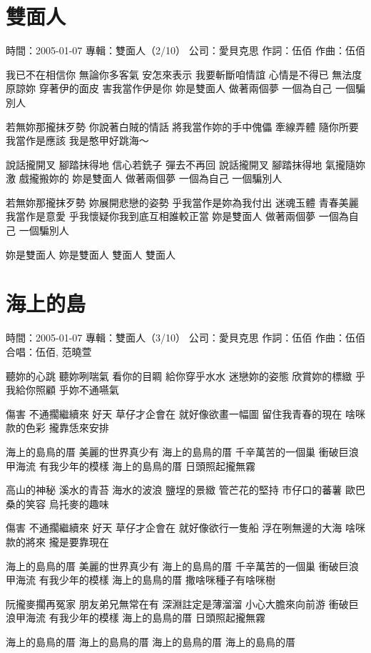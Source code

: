 \documentclass[UTF8,a4paper,oneside,twocolumn,12pt]{ctexbook}
\newcommand{\infopair}[2]{\textbullet #1：#2}
\newcommand{\zc}[1][伍佰]{\infopair{作詞}{#1}}
\newcommand{\zq}[1][伍佰]{\infopair{作曲}{#1}}
\newcommand{\zj}[1]{\infopair{專輯}{#1}}
\newcommand{\sj}[1]{\infopair{時間}{#1}}
\newcommand{\gs}[1]{\infopair{公司}{#1}}
\newenvironment{info}{\begin{flushleft}\kaishu
	}
	{\end{flushleft}\normalsize\yahei\par}
\newenvironment{lyric}{
	}
{}
\begin{document}
\section{雙面人}
\begin{info}
	\sj{2005-01-07}
	\zj{雙面人（2/10）}
	\gs{愛貝克思}
	\zc
	\zq
\end{info}
\begin{lyric}
	我已不在相信你 無論你多客氣
	安怎來表示 我要斬斷咱情誼
	心情是不得已 無法度原諒妳
	穿著伊的面皮 害我當作伊是你
	妳是雙面人 做著兩個夢
	一個為自己 一個騙別人

	若無妳那攏抹歹勢 你說著白賊的情話
	將我當作妳的手中傀儡
	牽線弄體 隨你所要 我當作是應該
	我是憨甲好跳海～

	說話攏開叉 腳踏抹得地
	信心若銑子 彈去不再回
	說話攏開叉 腳踏抹得地
	氣攏隨妳激 戲攏搬妳的
	妳是雙面人 做著兩個夢
	一個為自己 一個騙別人

	若無妳那攏抹歹勢 妳展開悲戀的姿勢
	乎我當作是妳為我付出
	迷魂玉體 青春美麗 我當作是意愛
	乎我懷疑你我到底互相誰較正當
	妳是雙面人 做著兩個夢
	一個為自己 一個騙別人

	妳是雙面人 妳是雙面人 雙面人 雙面人
\end{lyric}

\section{海上的島}
\begin{info}
	\sj{2005-01-07}
	\zj{雙面人（3/10）}
	\gs{愛貝克思}
	\zc
	\zq
	\infopair{合唱}{伍佰, 范曉萱}
\end{info}
\begin{lyric}
	聽妳的心跳 聽妳咧喘氣
	看你的目睭 給你穿乎水水
	迷戀妳的姿態 欣賞妳的標緻
	乎我給你照顧 乎妳不通嚥氣

	傷害 不通擱繼續來
	好天 草仔才企會在
	就好像欲畫一幅圖 留住我青春的現在
	啥咪款的色彩 攏靠恁來安排

	海上的島鳥的厝 美麗的世界真少有
	海上的島鳥的厝 千辛萬苦的一個巢
	衝破巨浪甲海流 有我少年的模樣
	海上的島鳥的厝 日頭照起攏無霧

	高山的神秘 溪水的青苔
	海水的波浪 鹽埕的景緻
	管芒花的堅持 市仔口的蕃薯
	歐巴桑的笑容 烏托麥的趣味

	傷害 不通擱繼續來
	好天 草仔才企會在
	就好像欲行一隻船 浮在咧無邊的大海
	啥咪款的將來 攏是要靠現在

	海上的島鳥的厝 美麗的世界真少有
	海上的島鳥的厝 千辛萬苦的一個巢
	衝破巨浪甲海流 有我少年的模樣
	海上的島鳥的厝 撒啥咪種子有啥咪樹

	阮攏麥擱再冤家 朋友弟兄無常在有
	深淵註定是薄溜溜 小心大膽來向前游
	衝破巨浪甲海流 有我少年的模樣
	海上的島鳥的厝 日頭照起攏無霧

	海上的島鳥的厝 海上的島鳥的厝
	海上的島鳥的厝 海上的島鳥的厝
\end{lyric}
\end{document}
